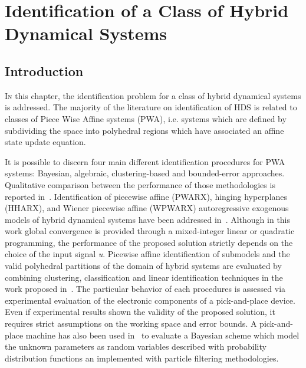 \chapter{Identification of a Class of Hybrid Dynamical Systems}

\label{chap:identification}
\minitoc

\thispagestyle{empty}

\newpage
\section{Introduction}
\lettrine[lines=4]{\color{brickred}I}{n} this chapter, the identification problem for a class of hybrid dynamical systems is addressed.
The majority of the literature on identification of HDS is related to classes of Piece Wise Affine systems (PWA), i.e. systems which are defined by subdividing the  space into polyhedral regions which have associated an affine state update equation.
%
\newline

%
It is possible to discern four main different identification procedures for PWA systems: Bayesian, algebraic, clustering-based and bounded-error approaches. Qualitative comparison between the performance of those methodologies is reported in~\citep{Juloski,Paoletti}.
Identification of piecewise affine (PWARX), hinging hyperplanes (HHARX), and Wiener piecewise affine (WPWARX) autoregressive exogenous models of hybrid dynamical systems have been addressed in~\citep{Bemporad}. Although in this work global convergence is provided through a mixed-integer linear or quadratic programming, the performance of the proposed solution strictly depends on the choice of the input signal \textit{u}. 
Picewise affine identification of submodels and the valid polyhedral partitions of the domain of hybrid systems are evaluated by combining clustering, classification and linear identification techniques in the work proposed in~\citep{Ferrari}. 
The particular behavior of each procedures is assessed via experimental evaluation of the electronic components of a pick-and-place device. Even if experimental results shown the validity of the proposed solution, it requires strict assumptions on the working space and error bounds.
A pick-and-place machine has also been used in~\citep{juloski2005bayesian} to evaluate a Bayesian scheme which model the unknown parameters as random variables described with probability distribution functions an implemented with particle filtering methodologies.
%
\newline

